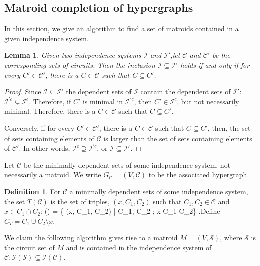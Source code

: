 \documentclass[11pt]{article}
\def\bas #1\eas{\begin{align*} #1 \end{align*}}
\newcommand{\sI}{\mathscr{I}}
\newcommand{\sC}{\mathscr{C}}
\newcommand{\sS}{\mathscr{S}}
\newtheorem{lem}[thm]{Lemma}
\theoremstyle{remark}
\theoremstyle{definition}
\newtheorem{dfn}[thm]{Definition}
\begin{document}
\subsection{Matroid completion of hypergraphs}

In this section, we give an algorithm to find a set of matroids contained in a given independence system. 

\begin{lem}\label{res:circuitinclusion}
    Given two independence systems $\sI$ and $\sI'$,let $\sC$ and $\sC'$ be the corresponding sets of circuits. Then the inclusion $\sI \subseteq \sI'$ holds if and only if for every $C' \in \sC'$, there is a $C \in \sC$ such that $C \subseteq C'$.
\end{lem}
\begin{proof}
    Since $\sI \subseteq \sI'$ the dependent sets of $\sI$ contain the dependent sets of $\sI'$: $\sI^{'c} \subsetneq \sI^c$. Therefore, if $C'$ is minimal in $\sI^{'c}$, then $C' \in \sI^c$, but not necessarily minimal. Therefore, there is a $C \in \sC$ such that $C \subseteq C'$.

    Conversely, if for every $C' \in \sC'$, there is a $C \in \sC$ such that $C \subseteq C'$, then, the set of sets containing elements of $\sC$ is larger than the set of sets containing elements of $\sC'$. In other words, $\sI^c \supseteq \sI^{'c}$, or $\sI \subseteq \sI'$. 
\end{proof}

Let $\sC$ be the minimally dependent sets of some independence system, not necessarily a matroid. We write $G_\sC = (V, \sC)$ to be the associated hypergraph. 

\begin{dfn} \label{dfn:triples}
    For $\sC$ a minimally dependent sets of some independence system, the set $T(\sC)$ is the set of triples, $(x, C_1, C_2)$ such that $C_1, C_2 \in \sC$ and $x \in C_1 \cap C_2$: \bas T(\sC) = \{  (x, C_1, C_2) | C_1, C_2 \in \sC; \;  x \in C_1 \cap C_2\} \;.\eas Define $C_T = C_1 \cup C_2 \setminus x$.
\end{dfn}

We claim the following algorithm gives rise to a matroid $M = (V, \sS)$, where $\sS$ is the circuit set of $M$ and is contained in the independence system of $\sC: \sI(\sS) \subseteq \sI(\sC)$.
\end{document}
